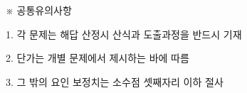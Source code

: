 \begin{framedtext}
※ 공통유의사항 \par
1. 각 문제는 해답 산정시 산식과 도출과정을 반드시 기재 \par
2. 단가는 개별 문제에서 제시하는 바에 따름 \par
3. 그 밖의 요인 보정치는 소수점 셋째자리 이하 절사 \par
\end{framedtext}
